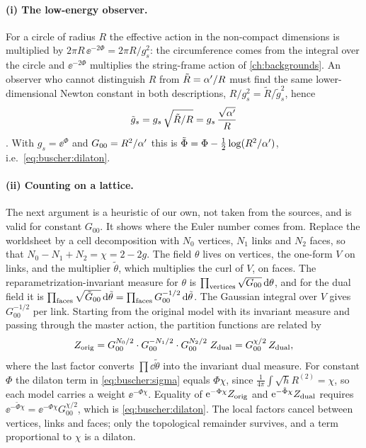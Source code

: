 \paragraph{(i) The low-energy observer.} For a circle of radius $R$ the effective action in
the non-compact dimensions is multiplied by $2\pi R\,\ee^{-2\Phi}=2\pi R/g_s^2$: the
circumference comes from the integral over the circle and $\ee^{-2\Phi}$ multiplies the
string-frame action of \cref{ch:backgrounds}. An observer who cannot distinguish $R$ from
$\tilde R=\alpha'/R$ must find the same lower-dimensional Newton constant in both descriptions,
$R/g_s^2=\tilde R/\tilde g_s^2$, hence
\begin{equation}\label{eq:buscher:gs}
 \tilde g_s=g_s\,\sqrt{\tilde R/R}=g_s\,\frac{\sqrt{\alpha'}}{R}
\end{equation}
. With $g_s=\ee^{\Phi}$ and $G_{00}=R^2/\alpha'$ this is
$\tilde\Phi=\Phi-\frac12\log(R^2/\alpha')$, i.e.\ \eqref{eq:buscher:dilaton}.

\paragraph{(ii) Counting on a lattice.} The next argument is a heuristic of our own, not taken
from the sources, and is valid for constant $G_{00}$. It shows where the Euler number comes
from. Replace the worldsheet by a cell decomposition with $N_0$ vertices, $N_1$ links and
$N_2$ faces, so that $N_0-N_1+N_2=\chi=2-2g$. The field $\theta$ lives on vertices, the
one-form $V$ on links, and the multiplier $\tilde\theta$, which multiplies the curl of $V$, on
faces. The reparametrization-invariant measure for $\theta$ is
$\prod_{\rm vertices}\sqrt{G_{00}}\,\mathrm{d}\theta$, and for the dual field it is
$\prod_{\rm faces}\sqrt{\tilde G_{00}}\,\mathrm{d}\tilde\theta
=\prod_{\rm faces}G_{00}^{-1/2}\,\mathrm{d}\tilde\theta$. The Gaussian integral over $V$ gives
$G_{00}^{-1/2}$ per link. Starting from the original model with its invariant measure and
passing through the master action, the partition functions are related by
\[
 Z_{\rm orig}=G_{00}^{N_0/2}\cdot G_{00}^{-N_1/2}\cdot G_{00}^{N_2/2}\;Z_{\rm dual}
 =G_{00}^{\chi/2}\,Z_{\rm dual},
\]
where the last factor converts $\prod\dd\tilde\theta$ into the invariant dual measure. For
constant $\Phi$ the dilaton term in \eqref{eq:buscher:sigma} equals $\Phi\chi$, since
$\frac{1}{4\pi}\int\sqrt h R^{(2)}=\chi$, so each model carries a weight $\ee^{-\Phi\chi}$.
Equality of $\mathrm{e}^{-\Phi\chi}Z_{\rm orig}$ and $\mathrm{e}^{-\tilde\Phi\chi}Z_{\rm dual}$ requires
$\ee^{-\tilde\Phi\chi}=\ee^{-\Phi\chi}G_{00}^{\chi/2}$, which is \eqref{eq:buscher:dilaton}.
The local factors cancel between vertices, links and faces; only the topological remainder
survives, and a term proportional to $\chi$ is a dilaton.

